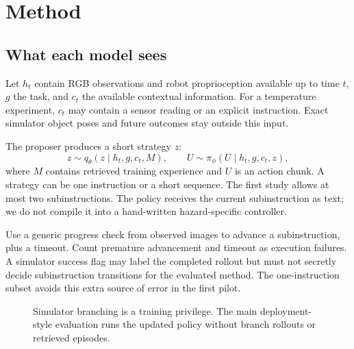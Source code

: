 \documentclass[11pt]{article}
\begin{document}
\section{Method}

\subsection{What each model sees}

Let $h_t$ contain RGB observations and robot proprioception available up to time $t$, $g$ the task, and $c_t$ the available contextual information. For a temperature experiment, $c_t$ may contain a sensor reading or an explicit instruction. Exact simulator object poses and future outcomes stay outside this input.

The proposer produces a short strategy $z$:
\begin{equation}
z\sim q_\theta(z\mid h_t,g,c_t,M),\qquad
U\sim\pi_\phi(U\mid h_t,g,c_t,z),
\end{equation}
where $M$ contains retrieved training experience and $U$ is an action chunk. A strategy can be one instruction or a short sequence. The first study allows at most two subinstructions. The policy receives the current subinstruction as text; we do not compile it into a hand-written hazard-specific controller.

Use a generic progress check from observed images to advance a subinstruction, plus a timeout. Count premature advancement and timeout as execution failures. A simulator success flag may label the completed rollout but must not secretly decide subinstruction transitions for the evaluated method. The one-instruction subset avoids this extra source of error in the first pilot.

\begin{figure}[htbp]
\centering
{}
\caption{Simulator branching is a training privilege. The main deployment-style evaluation runs the updated policy without branch rollouts or retrieved episodes.}
\end{figure}
\end{document}
